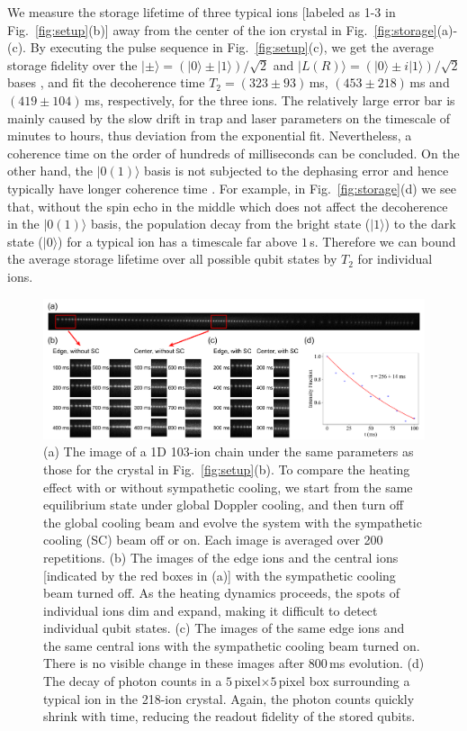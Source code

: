 \documentclass[aps,prl,reprint,superscriptaddress,twocolumn,longbibliography]{revtex4-1}
\begin{document}
We measure the storage lifetime of three typical ions [labeled as 1-3 in Fig.~\ref{fig:setup}(b)] away from the center of the ion crystal in Fig.~\ref{fig:storage}(a)-(c). By executing the pulse sequence in Fig.~\ref{fig:setup}(c), we get the average storage fidelity over the $|\pm\rangle=(|0\rangle\pm|1\rangle)/\sqrt{2}$ and $|L(R)\rangle=(|0\rangle\pm i|1\rangle)/\sqrt{2}$ bases \cite{wang2021single}, and fit the decoherence time $T_2=(323\pm 93)\,$ms, $(453\pm218)\,$ms and $(419\pm104)\,$ms, respectively, for the three ions. The relatively large error bar is mainly caused by the slow drift in trap and laser parameters on the timescale of minutes to hours, thus deviation from the exponential fit. Nevertheless, a coherence time on the order of hundreds of milliseconds can be concluded. On the other hand, the $|0(1)\rangle$ basis is not subjected to the dephasing error and hence typically have longer coherence time \cite{wang2021single}. For example, in Fig.~\ref{fig:storage}(d) we see that, without the spin echo in the middle which does not affect the decoherence in the $|0(1)\rangle$ basis, the population decay from the bright state ($|1\rangle$) to the dark state ($|0\rangle$) for a typical ion has a timescale far above $1\,$s. Therefore we can bound the average storage lifetime over all possible qubit states by $T_2$ for individual ions.
\begin{figure}[!tbp]
  \centering
  \includegraphics[width=\linewidth]{fig4.pdf}
  \caption{(a) The image of a 1D 103-ion chain under the same parameters as those for the crystal in Fig.~\ref{fig:setup}(b). To compare the heating effect with or without sympathetic cooling, we start from the same equilibrium state under global Doppler cooling, and then turn off the global cooling beam and evolve the system with the sympathetic cooling (SC) beam off or on.  Each image is averaged over 200 repetitions. (b) The images of the edge ions and the central ions [indicated by the red boxes in (a)] with the sympathetic cooling beam turned off. As the heating dynamics proceeds, the spots of individual ions dim and expand, making it difficult to detect individual qubit states. (c) The images of the same edge ions and the same central ions with the sympathetic cooling beam turned on. There is no visible change in these images after $800\,$ms evolution. (d) The decay of photon counts in a $5\,$pixel$\times5\,$pixel box surrounding a typical ion in the 218-ion crystal. Again, the photon counts quickly shrink with time, reducing the readout fidelity of the stored qubits.}\label{fig:cooling}
\end{figure}
\end{document}
